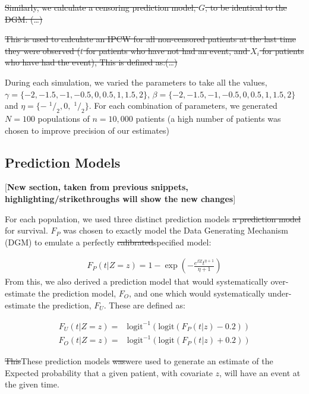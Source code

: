 \documentclass[
]{article}
\newcommand{\txt}[1]{\textrm{#1}}
\def\logit{\txt{logit}}
\newcommand{\sfrac}[2]{\;^{#1}/_{#2}}
\begin{document}
\sout{Similarly, we calculate a censoring prediction model, \(G\), to be identical to the DGM: (\ldots)}

\sout{This is used to calculate an IPCW for all non-censored patients at the last time they were observed (\(t\) for patients who have not had an event, and \(X_i\) for patients who have had the event), This is defined as:(\ldots)}

During each simulation, we varied the parameters to take all the values,\(\gamma = \{-2,-1.5,-1,-0.5,0,0.5,1,1.5,2\}\), \(\beta = \{-2,-1.5,-1,-0.5,0,0.5,1,1.5,2\}\) and \(\eta = \{-\sfrac{1}{2},0,\sfrac{1}{2}\}\). For each combination of parameters, we generated \(N = 100\) populations of \(n = 10,000\) patients (a high number of patients was chosen to improve precision of our estimates)

\hypertarget{prediction-models}{%
\subsection{Prediction Models}\label{prediction-models}}

{[}\textbf{New section, taken from previous snippets, highlighting/strikethroughs will show the new changes}{]}

For each population, we used three distinct prediction models \sout{a prediction model} for survival. \(F_P\) was chosen to exactly model the Data Generating Mechanism (DGM) to emulate a perfectly \sout{calibrated}specified model:

\[
\begin{array}{c}
F_P(t|Z = z) = 1 - \exp\left(-\frac{e^{\beta Z}t^{\eta+1}}{\eta+1}\right)
\end{array}
\]
From this, we also derived a prediction model that would systematically over-estimate the prediction model, \(F_O\), and one which would systematically under-estimate the prediction, \(F_U\). These are defined as:

\[
\begin{array}{rl}
F_U(t|Z=z) =& \logit^{-1}\left(\logit\left( F_P(t|z) - 0.2\right)\right)
\end{array}
\]
\[
\begin{array}{rl}
F_O(t|Z=z) =& \logit^{-1}\left(\logit\left( F_P(t|z) + 0.2\right)\right)
\end{array}
\]

\sout{This}These prediction models \sout{was}were used to generate an estimate of the Expected probability that a given patient, with covariate \(z\), will have an event at the given time.
\end{document}
